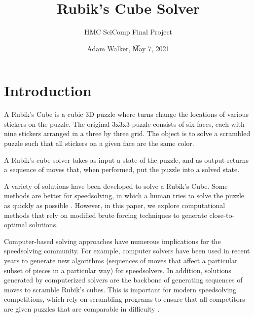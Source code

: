 \documentclass{article}
\title{Rubik's Cube Solver}
\author{HMC SciComp Final Project}
\date{Adam Walker, \t May 7, 2021}
\begin{document}
\maketitle

\section{Introduction}

A Rubik's Cube is a cubic 3D puzzle where turns change the locations of various stickers on the puzzle. The original 3x3x3 puzzle consists of six faces, each with nine stickers arranged in a three by three grid. The object is to solve a scrambled puzzle such that all stickers on a given face are the same color.

A Rubik's cube solver takes as input a state of the puzzle, and as output returns a sequence of moves that, when performed, put the puzzle into a solved state.

A variety of solutions have been developed to solve a Rubik's Cube. Some methods are better for speedsolving, in which a human tries to solve the puzzle as quickly as possible \cite{speedcubing}. However, in this paper, we explore computational methods that rely on modified brute forcing techniques to generate close-to-optimal solutions.

Computer-based solving approaches have numerous implications for the speedsolving community. For example, computer solvers have been used in recent years to generate new algorithms (sequences of moves that affect a particular subset of pieces in a particular way) for speedsolvers. In addition, solutions generated by computerized solvers are the backbone of generating sequences of moves to scramble Rubik's cubes. This is important for modern speedsolving competitions, which rely on scrambling programs to ensure that all competitors are given puzzles that are comparable in difficulty \cite{wca-scrambles}.

\end{document}
